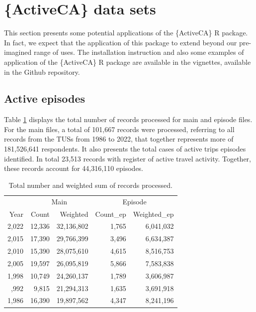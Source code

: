 \documentclass[Royal,times,sageh]{sagej}
\begin{document}
\section{\{ActiveCA\} data sets}\label{activeca-data-sets}

This section presents some potential applications of the \{ActiveCA\} R
package. In fact, we expect that the application of this package to
extend beyond our pre-imagined range of uses. The installation
instruction and also some examples of application of the \{ActiveCA\} R
package are available in the vignettes, available in the Github
repository.

\subsection{Active episodes}\label{active-episodes}

Table \ref{tab:processed-obs} displays the total number of records
processed for main and episode files. For the main files, a total of
101,667 records were processed, referring to all records from the TUSs
from 1986 to 2022, that together represents more of 181,526,641
respondents. It also presents the total cases of active trips episodes
identified. In total 23,513 records with register of active travel
activity. Together, these records account for 44,316,110 episodes.

\begin{table}
\centering
\caption{\label{tab:table_df_processed}\label{tab:processed-obs}Total number and weighted sum of records processed.}
\centering
\fontsize{8}{10}\selectfont
\begin{tabular}[t]{rr>{}r|rr}
\toprule
\multicolumn{1}{c}{ } & \multicolumn{2}{c}{Main} & \multicolumn{2}{c}{Episode} \\
\cmidrule(l{3pt}r{3pt}){2-3} \cmidrule(l{3pt}r{3pt}){4-5}
Year & Count & Weighted & Count\_ep & Weighted\_ep\\
\midrule
2,022 & 12,336 & 32,136,802 & 1,765 & 6,041,032\\
2,015 & 17,390 & 29,766,399 & 3,496 & 6,634,387\\
2,010 & 15,390 & 28,075,610 & 4,615 & 8,516,753\\
2,005 & 19,597 & 26,095,819 & 5,866 & 7,583,838\\
1,998 & 10,749 & 24,260,137 & 1,789 & 3,606,987\\
\addlinespace
1,992 & 9,815 & 21,294,313 & 1,635 & 3,691,918\\
1,986 & 16,390 & 19,897,562 & 4,347 & 8,241,196\\
\bottomrule
\end{tabular}
\end{table}
\end{document}
